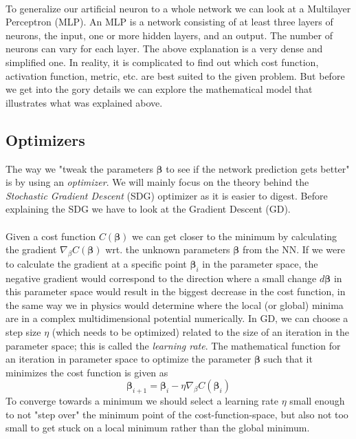 \documentclass[12pt, a4paper]{book}
\begin{document}
\\To generalize our artificial neuron to a whole network we can look at a Multilayer Perceptron (MLP). An MLP is a network consisting of at least three layers of neurons, the input, one or more hidden layers, and an output. 
The number of neurons can vary for each layer. The above explanation is a very dense and simplified one. In reality, it is complicated to find out which cost function, activation function, metric, etc. are best suited to the given problem. 
But before we get into the gory details we can explore the mathematical model that illustrates what was explained above. 

\subsection{Optimizers}\label{sec:SGD}
The way we "tweak the parameters $\bm \beta $ to see if the network prediction gets better" is by using an \textit{optimizer}. We will mainly focus on the theory behind the \textit{Stochastic Gradient Descent} (SDG) optimizer as it is easier to digest. Before explaining the SDG we have to look at the Gradient Descent (GD). \\
\\Given a cost function $C(\bm{\beta})$ we can get closer to the minimum by calculating the gradient $\nabla_{\beta}C(\bm{\beta})$ wrt. the unknown parameters $\bm\beta$ from the NN. If we were to calculate the gradient at a specific 
point $\bm{\beta}_i$ in the parameter space, the negative gradient would correspond to the direction where a small change $d\bm\beta$ in this parameter space would result in the biggest decrease in the cost function, in the same way we in physics would determine where the local (or global) minima are in a complex multidimensional potential numerically. In GD, we can choose a step size $\eta$ (which needs to be optimized) related to the size of an iteration in the parameter space; 
this is called the \textit{learning rate}. The mathematical function for an iteration in parameter space to optimize the parameter $\bm{\beta}$ such that it minimizes the cost function is given as
\begin{equation}\label{eq:GD}
    \bm{\beta}_{i+1}=\bm{\beta}_{i} -\eta\nabla_{\beta}C(\bm{\beta}_i)
\end{equation}
To converge towards a minimum we should select a learning rate $\eta$ small enough to not "step over" the minimum point of the cost-function-space, but also not too small to get stuck on a local minimum rather than the global minimum. 
\end{document}
